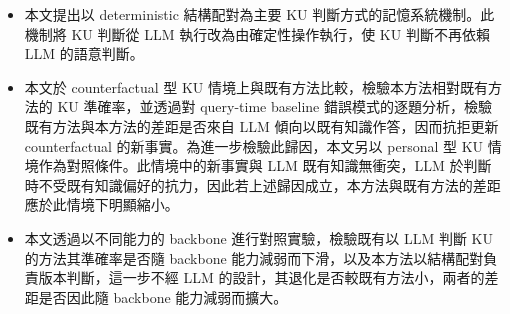 \begin{itemize}
\item 本文提出以 deterministic 結構配對為主要 KU 判斷方式的記憶系統機制。此機制將 KU 判斷從 LLM 執行改為由確定性操作執行，使 KU 判斷不再依賴 LLM 的語意判斷。
\item 本文於 counterfactual 型 KU 情境上與既有方法比較，檢驗本方法相對既有方法的 KU 準確率，並透過對 query-time baseline 錯誤模式的逐題分析，檢驗既有方法與本方法的差距是否來自 LLM 傾向以既有知識作答，因而抗拒更新 counterfactual 的新事實。為進一步檢驗此歸因，本文另以 personal 型 KU 情境作為對照條件。此情境中的新事實與 LLM 既有知識無衝突，LLM 於判斷時不受既有知識偏好的抗力，因此若上述歸因成立，本方法與既有方法的差距應於此情境下明顯縮小。
\item 本文透過以不同能力的 backbone 進行對照實驗，檢驗既有以 LLM 判斷 KU 的方法其準確率是否隨 backbone 能力減弱而下滑，以及本方法以結構配對負責版本判斷，這一步不經 LLM 的設計，其退化是否較既有方法小，兩者的差距是否因此隨 backbone 能力減弱而擴大。
\end{itemize}